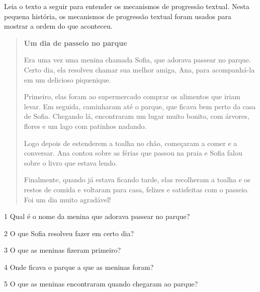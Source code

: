 
Leia o texto a seguir para entender os mecanismos de progressão textual.
Nesta pequena história, os mecanismos de progressão textual foram usados para
mostrar a ordem do que aconteceu.

\begin{quote}
\textbf{Um dia de passeio no parque}

Era uma vez uma menina chamada Sofia, que adorava passear no parque.
Certo dia, ela resolveu chamar sua melhor amiga, Ana, para
acompanhá-la em um delicioso piquenique.

Primeiro, elas foram ao supermercado comprar os alimentos que iriam
levar. Em seguida, caminharam até o parque, que ficava bem perto da casa
de Sofia. Chegando lá, encontraram um lugar muito bonito, com árvores,
flores e um lago com patinhos nadando.

Logo depois de estenderem a toalha no chão, começaram a comer e a
conversar. Ana contou sobre as férias que passou na praia e Sofia
falou sobre o livro que estava lendo.

Finalmente, quando já estava ficando tarde, elas recolheram a toalha e
os restos de comida e voltaram para casa, felizes e satisfeitas com o
passeio. Foi um dia muito agradável!

\end{quote}


\num{1} Qual é o nome da menina que adorava passear no parque?



\num{2} O que Sofia resolveu fazer em certo dia?


\pagebreak
\num{3} O que as meninas fizeram primeiro?


\num{4} Onde ficava o parque a que as meninas foram?



\num{5} O que as meninas encontraram quando chegaram ao parque?



